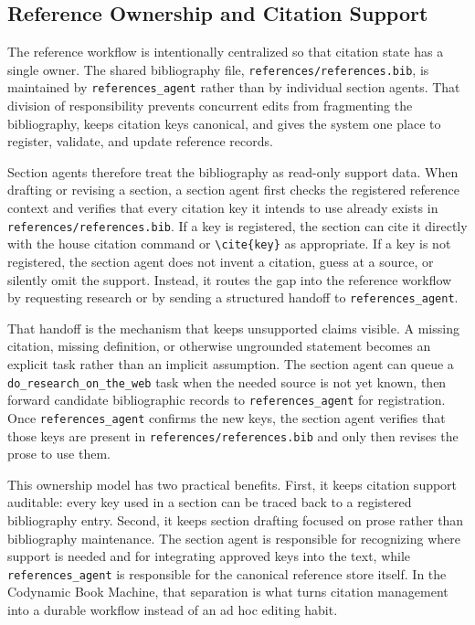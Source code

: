\documentclass[11pt]{article}
\begin{document}
\subsection{Reference Ownership and Citation Support}


The reference workflow is intentionally centralized so that citation state has a single owner. The shared bibliography file, \texttt{references/references.bib}, is maintained by \texttt{references\_agent} rather than by individual section agents. That division of responsibility prevents concurrent edits from fragmenting the bibliography, keeps citation keys canonical, and gives the system one place to register, validate, and update reference records.

Section agents therefore treat the bibliography as read-only support data. When drafting or revising a section, a section agent first checks the registered reference context and verifies that every citation key it intends to use already exists in \texttt{references/references.bib}. If a key is registered, the section can cite it directly with the house citation command or \texttt{\textbackslash cite\{key\}} as appropriate. If a key is not registered, the section agent does not invent a citation, guess at a source, or silently omit the support. Instead, it routes the gap into the reference workflow by requesting research or by sending a structured handoff to \texttt{references\_agent}.

That handoff is the mechanism that keeps unsupported claims visible. A missing citation, missing definition, or otherwise ungrounded statement becomes an explicit task rather than an implicit assumption. The section agent can queue a \texttt{do\_research\_on\_the\_web} task when the needed source is not yet known, then forward candidate bibliographic records to \texttt{references\_agent} for registration. Once \texttt{references\_agent} confirms the new keys, the section agent verifies that those keys are present in \texttt{references/references.bib} and only then revises the prose to use them.

This ownership model has two practical benefits. First, it keeps citation support auditable: every key used in a section can be traced back to a registered bibliography entry. Second, it keeps section drafting focused on prose rather than bibliography maintenance. The section agent is responsible for recognizing where support is needed and for integrating approved keys into the text, while \texttt{references\_agent} is responsible for the canonical reference store itself. In the Codynamic Book Machine, that separation is what turns citation management into a durable workflow instead of an ad hoc editing habit.
\end{document}

